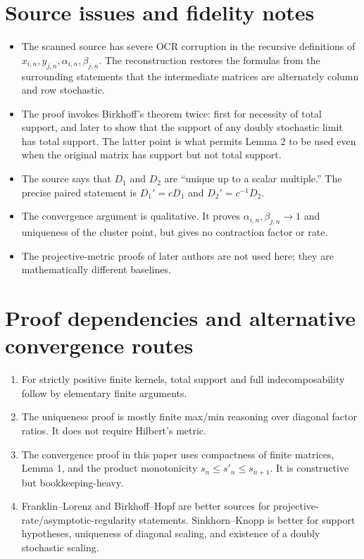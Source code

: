 \section*{Source issues and fidelity notes}
\begin{itemize}[leftmargin=2em]
\item The scanned source has severe OCR corruption in the recursive definitions of \(x_{i,n},y_{j,n},\alpha_{i,n},\beta_{j,n}\).  The reconstruction restores the formulas from the surrounding statements that the intermediate matrices are alternately column and row stochastic.
\item The proof invokes Birkhoff's theorem twice: first for necessity of total support, and later to show that the support of any doubly stochastic limit has total support.  The latter point is what permits Lemma 2 to be used even when the original matrix has support but not total support.
\item The source says that \(D_1\) and \(D_2\) are ``unique up to a scalar multiple.''  The precise paired statement is \(D_1' = cD_1\) and \(D_2'=c^{-1}D_2\).
\item The convergence argument is qualitative.  It proves \(\alpha_{i,n},\beta_{j,n}\to1\) and uniqueness of the cluster point, but gives no contraction factor or rate.
\item The projective-metric proofs of later authors are not used here; they are mathematically different baselines.
\end{itemize}

\section{Proof dependencies and alternative convergence routes}
\begin{enumerate}[leftmargin=2em]
\item For strictly positive finite kernels, total support and full indecomposability follow by elementary finite arguments.
\item The uniqueness proof is mostly finite max/min reasoning over diagonal factor ratios.  It does not require Hilbert's metric.
\item The convergence proof in this paper uses compactness of finite matrices, Lemma 1, and the product monotonicity \(s_n\le s'_n\le s_{n+1}\).  It is constructive but bookkeeping-heavy.
\item Franklin--Lorenz and Birkhoff--Hopf are better sources for projective-rate/asymptotic-regularity statements.  Sinkhorn--Knopp is better for support hypotheses, uniqueness of diagonal scaling, and existence of a doubly stochastic scaling.
\end{enumerate}



